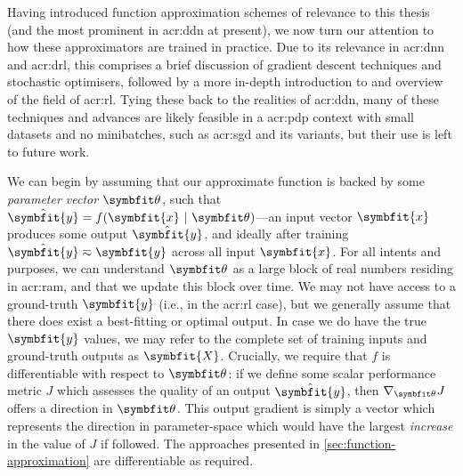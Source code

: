 Having introduced function approximation schemes of relevance to this thesis (and the most prominent in \gls{acr:ddn} at present), we now turn our attention to how these approximators are trained in practice.
Due to its relevance in \gls{acr:dnn} and \gls{acr:drl}, this comprises a brief discussion of gradient descent techniques and stochastic optimisers, followed by a more in-depth introduction to and overview of the field of \gls{acr:rl}.
Tying these back to the realities of \gls{acr:ddn}, many of these techniques and advances are likely feasible in a \gls{acr:pdp} context with small datasets and no minibatches, such as \gls{acr:sgd} and its variants, but their use is left to future work.

We can begin by assuming that our approximate function is backed by some \emph{parameter vector} $\wvec{}$, such that $\hat{\symbfit{y}} = f{\left(\symbfit{x}~|~\wvec{}\right)}$---an input vector $\symbfit{x}$ produces some output $\hat{\symbfit{y}}$, and ideally after training $\hat{\symbfit{y}}\eqsim\symbfit{y}$ across all input $\symbfit{x}$.
For all intents and purposes, we can understand $\wvec{}$ as a large block of real numbers residing in \gls{acr:ram}, and that we update this block over time.
We may not have access to a ground-truth $\symbfit{y}$ (i.e., in the \gls{acr:rl} case), but we generally assume that there does exist a best-fitting or optimal output.
In case we do have the true $\symbfit{y}$ values, we may refer to the complete set of training inputs and ground-truth outputs as $\symbfit{X}$.
Crucially, we require that $f$ is differentiable with respect to $\wvec{}$: if we define some scalar performance metric $J$ which assesses the quality of an output $\hat{\symbfit{y}}$, then $\nabla_{\wvec{}}{J}$ offers a direction in $\wvec{}$.
This output gradient is simply a vector which represents the direction in parameter-space which  would have the largest \emph{increase} in the value of $J$ if followed.
The approaches presented in \cref{sec:function-approximation} are differentiable as required.

